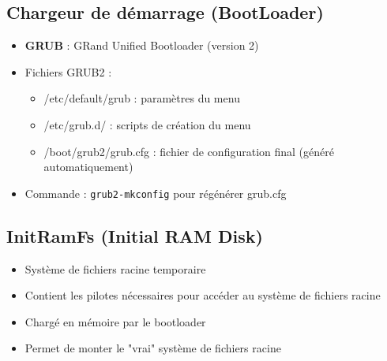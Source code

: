 \documentclass[12pt,a4paper]{article}
\begin{document}

\subsection{Chargeur de d\'emarrage (BootLoader)}
\begin{itemize}
    \item \textbf{GRUB} : GRand Unified Bootloader (version 2) %
    \item Fichiers GRUB2 :
    \begin{itemize}
        \item /etc/default/grub : param\`etres du menu %
        \item /etc/grub.d/ : scripts de cr\'eation du menu %
        \item /boot/grub2/grub.cfg : fichier de configuration final (g\'en\'er\'e automatiquement) %
    \end{itemize}
    \item Commande : \texttt{grub2-mkconfig} pour r\'eg\'en\'erer grub.cfg %
\end{itemize}


\subsection{InitRamFs (Initial RAM Disk)}
\begin{itemize}
    \item Syst\`eme de fichiers racine temporaire %
    \item Contient les pilotes n\'ecessaires pour acc\'eder au syst\`eme de fichiers racine %
    \item Charg\'e en m\'emoire par le bootloader %
    \item Permet de monter le "vrai" syst\`eme de fichiers racine %
\end{itemize}
\end{document}
